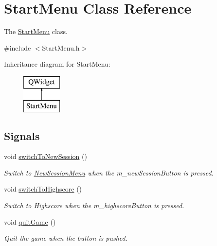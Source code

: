 \hypertarget{classStartMenu}{\section{Start\-Menu Class Reference}
\label{classStartMenu}
}


The \hyperlink{classStartMenu}{Start\-Menu} class.  




{\ttfamily \#include $<$Start\-Menu.\-h$>$}

Inheritance diagram for Start\-Menu\-:\begin{figure}[H]
\begin{center}
\leavevmode
\includegraphics[height=2.000000cm]{classStartMenu}
\end{center}
\end{figure}
\subsection*{Signals}
\begin{DoxyCompactItemize}
\item 
\hypertarget{classStartMenu_a94d2da8144b5e99707ef5dc1ea588982}{void \hyperlink{classStartMenu_a94d2da8144b5e99707ef5dc1ea588982}{switch\-To\-New\-Session} ()}\label{classStartMenu_a94d2da8144b5e99707ef5dc1ea588982}

\begin{DoxyCompactList}\small\item\em Switch to \hyperlink{classNewSessionMenu}{New\-Session\-Menu} when the m\-\_\-new\-Session\-Button is pressed. \end{DoxyCompactList}\item 
\hypertarget{classStartMenu_a95881192196673c85ad1dc12df5f9820}{void \hyperlink{classStartMenu_a95881192196673c85ad1dc12df5f9820}{switch\-To\-Highscore} ()}\label{classStartMenu_a95881192196673c85ad1dc12df5f9820}

\begin{DoxyCompactList}\small\item\em Switch to Highscore when the m\-\_\-highscore\-Button is pressed. \end{DoxyCompactList}\item 
\hypertarget{classStartMenu_aff58f89652b89899b21d40f3188b516d}{void \hyperlink{classStartMenu_aff58f89652b89899b21d40f3188b516d}{quit\-Game} ()}\label{classStartMenu_aff58f89652b89899b21d40f3188b516d}

\begin{DoxyCompactList}\small\item\em Quit the game when the button is pushed. \end{DoxyCompactList}\end{DoxyCompactItemize}
